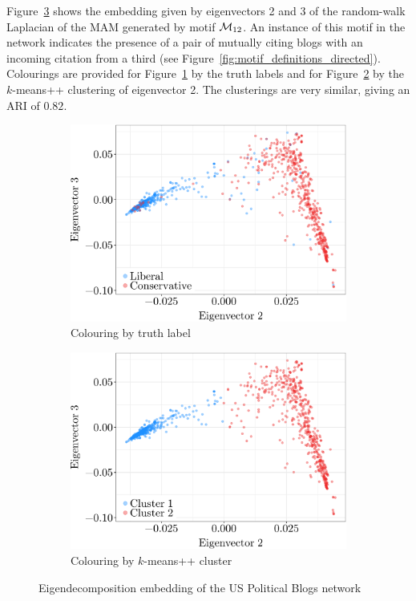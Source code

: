 Figure~\ref{fig:polblogs_embedding} shows the embedding given by eigenvectors 2 and 3 of the random-walk Laplacian of the MAM generated by motif $\mathcal{M}_{12}$. An instance of this motif in the network indicates the presence of a pair of mutually citing blogs with an incoming citation from a third (see Figure~\ref{fig:motif_definitions_directed}). Colourings are provided for Figure~\ref{fig:polblogs_embedding_truth} by the truth labels and for Figure~\ref{fig:polblogs_embedding_kmeans} by the $k$-means++ clustering of eigenvector 2. The clusterings are very similar, giving an ARI of $0.82$.


\vspace*{0.5cm}
\begin{figure}[H]
	\begin{subfigure}{.49\textwidth}
		\centering
		\includegraphics[scale=0.4,draft=false]{../../results/polblogs/polblogs_M12_truth.pdf}
		\caption{Colouring by truth label}
		\label{fig:polblogs_embedding_truth} 
	\end{subfigure}
	\begin{subfigure}{.49\textwidth}
		\centering
		\includegraphics[scale=0.4,draft=false]{../../results/polblogs/polblogs_M12_clusts.pdf}
		\caption{Colouring by $k$-means++ cluster}
		\label{fig:polblogs_embedding_kmeans} 
	\end{subfigure}
	\caption{Eigendecomposition embedding of the US Political Blogs network}
	\label{fig:polblogs_embedding}
\end{figure}
